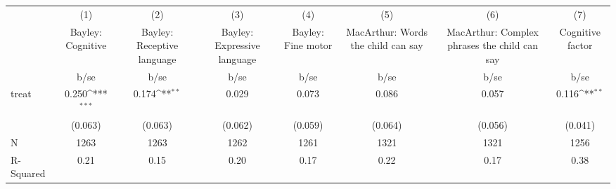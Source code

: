 {
\def\sym#1{\ifmmode^{#1}\else\(^{#1}\)\fi}
\begin{tabular}{l*{7}{c}}
\hline\hline
                    &\multicolumn{1}{c}{(1)}&\multicolumn{1}{c}{(2)}&\multicolumn{1}{c}{(3)}&\multicolumn{1}{c}{(4)}&\multicolumn{1}{c}{(5)}&\multicolumn{1}{c}{(6)}&\multicolumn{1}{c}{(7)}\\
                    &\multicolumn{1}{c}{Bayley: Cognitive}&\multicolumn{1}{c}{Bayley: Receptive language}&\multicolumn{1}{c}{Bayley: Expressive language}&\multicolumn{1}{c}{Bayley: Fine motor}&\multicolumn{1}{c}{MacArthur: Words the child can say}&\multicolumn{1}{c}{MacArthur: Complex phrases the child can say}&\multicolumn{1}{c}{Cognitive factor}\\
                    &        b/se         &        b/se         &        b/se         &        b/se         &        b/se         &        b/se         &        b/se         \\
\hline
treat               &       0.250\sym{***}&       0.174\sym{**} &       0.029         &       0.073         &       0.086         &       0.057         &       0.116\sym{**} \\
                    &     (0.063)         &     (0.063)         &     (0.062)         &     (0.059)         &     (0.064)         &     (0.056)         &     (0.041)         \\
\hline
N                   &        1263         &        1263         &        1262         &        1261         &        1321         &        1321         &        1256         \\
R-Squared           &        0.21         &        0.15         &        0.20         &        0.17         &        0.22         &        0.17         &        0.38         \\
\hline\hline
\end{tabular}
}
